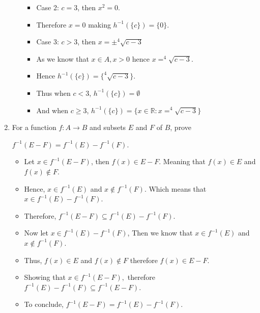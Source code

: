 \documentclass[letterpaper,12pt]{article}
\begin{document}
\begin{enumerate}
\begin{itemize}
\begin{itemize}
		\item Case 2: $c=3$, then $x^2 = 0$.
		\item Therefore $x=0$ making $h^{-1}(\{c\}) = \{0\}.$
		\item Case 3: $c>3$, then $x = \pm ^{4}\sqrt{c-3}$
		\item As we know that $x \in A , x>0$ hence $x=^4\sqrt{c-3}$.
		\item Hence $h^{-1}(\{c\}) = \{^4\sqrt{c-3}\}.$
		\item Thus when $c<3$, $h^{-1}(\{c\}) = \emptyset$
		\item And when $c \geq 3$, $h^{-1}(\{c\}) = \{x\in \mathbb{R} : x=^{4}\sqrt{c-3}\}$
		\end{itemize}
	\end{itemize} 
	\item For a function $f : A \rightarrow B$ and subsets $E$ and $F$ of $B$, prove 
	\begin{center}
		$f^{-1}(E-F)= f^{-1}(E)-f^{-1}(F)$.
	\end{center}
	\begin{itemize}
		\item Let $x \in f^{-1}(E-F)$, then $f(x) \in E-F$. Meaning that $f(x) \in E $ and $f(x) \notin F$.
		\item Hence, $x \in  f^{-1}(E)$ and $x \notin f^{-1}(F)$. Which means that $x \in f^{-1}(E)-f^{-1}(F)$. 
		\item Therefore, $f^{-1}(E-F) \subseteq f^{-1}(E)-f^{-1}(F)$.
		\item Now let $x \in f^{-1}(E)-f^{-1}(F)$, Then we know that $x \in f^{-1}(E)$ and $ x \notin f^{-1}(F)$.
		\item Thus, $f(x) \in E $ and $f(x) \notin F$ therefore $f(x) \in E-F$.
		\item Showing that $x \in f^{-1}(E-F), $ therefore $f^{-1}(E)-f^{-1}(F) \subseteq  f^{-1}(E-F)$.
		\item To conclude, $f^{-1}(E-F)= f^{-1}(E)-f^{-1}(F) $.
	\end{itemize}
	

\end{enumerate}
\end{document}
